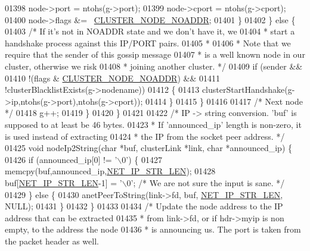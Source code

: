 \begin{DoxyCode}
{{{{{{{{{{{{{{{{{{{{01398                 node->port = ntohs(g->port);
01399                 node->cport = ntohs(g->cport);
01400                 node->flags &= ~\hyperlink{cluster_8h_a2bbed8bf0615871a01ca8b7f691b56d8}{CLUSTER\_NODE\_NOADDR};
01401             \}
01402         \} \textcolor{keywordflow}{else} \{
01403             \textcolor{comment}{/* If it's not in NOADDR state and we don't have it, we}
01404 \textcolor{comment}{             * start a handshake process against this IP/PORT pairs.}
01405 \textcolor{comment}{             *}
01406 \textcolor{comment}{             * Note that we require that the sender of this gossip message}
01407 \textcolor{comment}{             * is a well known node in our cluster, otherwise we risk}
01408 \textcolor{comment}{             * joining another cluster. */}
01409             \textcolor{keywordflow}{if} (sender &&
01410                 !(flags & \hyperlink{cluster_8h_a2bbed8bf0615871a01ca8b7f691b56d8}{CLUSTER\_NODE\_NOADDR}) &&
01411                 !clusterBlacklistExists(g->nodename))
01412             \{
01413                 clusterStartHandshake(g->ip,ntohs(g->port),ntohs(g->cport));
01414             \}
01415         \}
01416 
01417         \textcolor{comment}{/* Next node */}
01418         g++;
01419     \}
01420 \}
01421 
01422 \textcolor{comment}{/* IP -> string conversion. 'buf' is supposed to at least be 46 bytes.}
01423 \textcolor{comment}{ * If 'announced\_ip' length is non-zero, it is used instead of extracting}
01424 \textcolor{comment}{ * the IP from the socket peer address. */}
01425 \textcolor{keywordtype}{void} nodeIp2String(\textcolor{keywordtype}{char} *buf, clusterLink *link, \textcolor{keywordtype}{char} *announced\_ip) \{
01426     \textcolor{keywordflow}{if} (announced\_ip[0] != \textcolor{stringliteral}{'\(\backslash\)0'}) \{
01427         memcpy(buf,announced\_ip,\hyperlink{server_8h_ad97c5405ed22a94e9fcc10fba577d6c0}{NET\_IP\_STR\_LEN});
01428         buf[\hyperlink{server_8h_ad97c5405ed22a94e9fcc10fba577d6c0}{NET\_IP\_STR\_LEN}-1] = \textcolor{stringliteral}{'\(\backslash\)0'}; \textcolor{comment}{/* We are not sure the input is sane. */}
01429     \} \textcolor{keywordflow}{else} \{
01430         anetPeerToString(link->fd, buf, \hyperlink{server_8h_ad97c5405ed22a94e9fcc10fba577d6c0}{NET\_IP\_STR\_LEN}, NULL);
01431     \}
01432 \}
01433 
01434 \textcolor{comment}{/* Update the node address to the IP address that can be extracted}
01435 \textcolor{comment}{ * from link->fd, or if hdr->myip is non empty, to the address the node}
01436 \textcolor{comment}{ * is announcing us. The port is taken from the packet header as well.}
}}}}}}}}}}}}}}}}}}}}
\end{DoxyCode}
